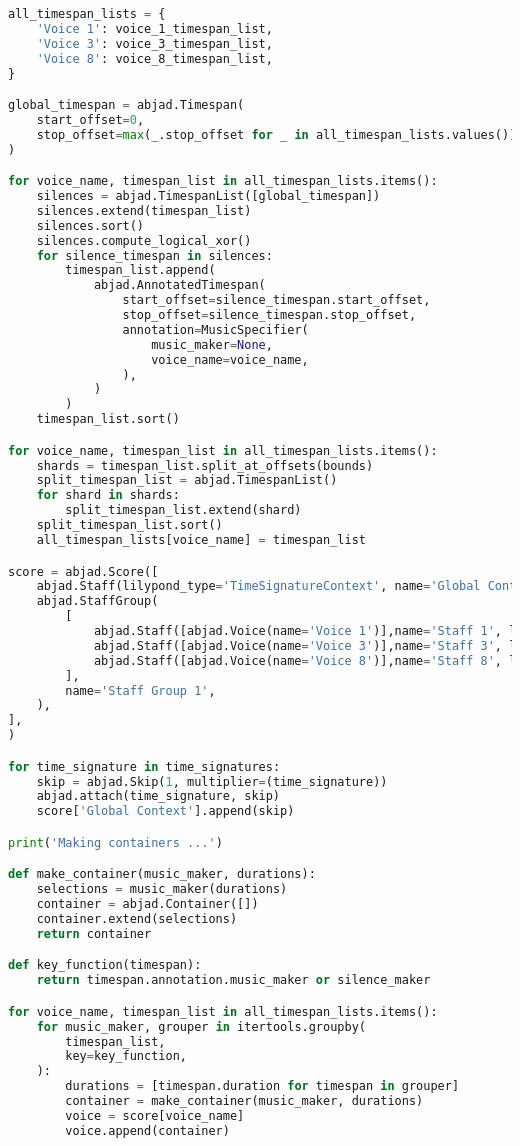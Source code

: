 \begin{lstlisting}[language=Python, caption=Four Ages of Sand Segment\_IV]
all_timespan_lists = {
    'Voice 1': voice_1_timespan_list,
    'Voice 3': voice_3_timespan_list,
    'Voice 8': voice_8_timespan_list,
}

global_timespan = abjad.Timespan(
    start_offset=0,
    stop_offset=max(_.stop_offset for _ in all_timespan_lists.values())
)

for voice_name, timespan_list in all_timespan_lists.items():
    silences = abjad.TimespanList([global_timespan])
    silences.extend(timespan_list)
    silences.sort()
    silences.compute_logical_xor()
    for silence_timespan in silences:
        timespan_list.append(
            abjad.AnnotatedTimespan(
                start_offset=silence_timespan.start_offset,
                stop_offset=silence_timespan.stop_offset,
                annotation=MusicSpecifier(
                    music_maker=None,
                    voice_name=voice_name,
                ),
            )
        )
    timespan_list.sort()

for voice_name, timespan_list in all_timespan_lists.items():
    shards = timespan_list.split_at_offsets(bounds)
    split_timespan_list = abjad.TimespanList()
    for shard in shards:
        split_timespan_list.extend(shard)
    split_timespan_list.sort()
    all_timespan_lists[voice_name] = timespan_list

score = abjad.Score([
    abjad.Staff(lilypond_type='TimeSignatureContext', name='Global Context'),
    abjad.StaffGroup(
        [
            abjad.Staff([abjad.Voice(name='Voice 1')],name='Staff 1', lilypond_type='Staff',),
            abjad.Staff([abjad.Voice(name='Voice 3')],name='Staff 3', lilypond_type='Staff',),
            abjad.Staff([abjad.Voice(name='Voice 8')],name='Staff 8', lilypond_type='Staff',),
        ],
        name='Staff Group 1',
    ),
],
)

for time_signature in time_signatures:
    skip = abjad.Skip(1, multiplier=(time_signature))
    abjad.attach(time_signature, skip)
    score['Global Context'].append(skip)

print('Making containers ...')

def make_container(music_maker, durations):
    selections = music_maker(durations)
    container = abjad.Container([])
    container.extend(selections)
    return container

def key_function(timespan):
    return timespan.annotation.music_maker or silence_maker

for voice_name, timespan_list in all_timespan_lists.items():
    for music_maker, grouper in itertools.groupby(
        timespan_list,
        key=key_function,
    ):
        durations = [timespan.duration for timespan in grouper]
        container = make_container(music_maker, durations)
        voice = score[voice_name]
        voice.append(container)


\end{lstlisting}
